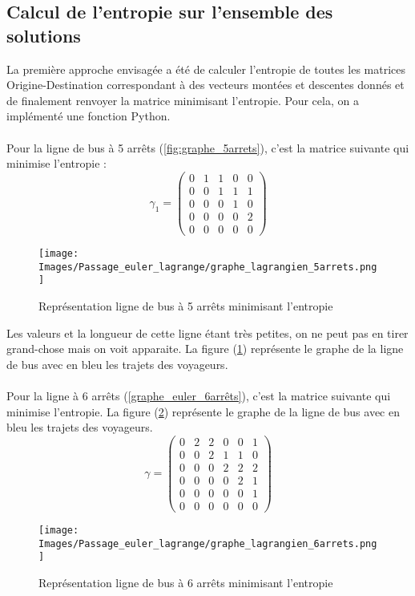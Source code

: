 \documentclass[12pt]{article}
\begin{document}
\subsection{Calcul de l'entropie sur l'ensemble des solutions}
La première approche envisagée a été de calculer l'entropie de toutes les matrices Origine-Destination correspondant à des vecteurs montées et descentes donnés et de finalement renvoyer la matrice minimisant l'entropie. Pour cela, on a implémenté une fonction Python.\\
\\
Pour la ligne de bus à 5 arrêts (\ref{fig:graphe_5arrets}), c'est la matrice suivante qui minimise l'entropie :
 \[\gamma_1 = 
\begin{pmatrix}
0 & 1 & 1 & 0 & 0\\
0 & 0 & 1 & 1 &  1\\
0 & 0 & 0 & 1 & 0 \\
0 & 0 & 0 & 0 & 2 \\
0 & 0 & 0 & 0 & 0 
\end{pmatrix}\]
\begin{figure}[H]
    \centering
    \texttt{[image: Images/Passage\_euler\_lagrange/graphe\_lagrangien\_5arrets.png]}
    \caption{Représentation ligne de bus à 5 arrêts minimisant l'entropie}
    \label{graphe_lagrange_5arrêts}
\end{figure}
Les valeurs et la longueur de cette ligne étant très petites, on ne peut pas en tirer grand-chose mais on voit apparaite. La figure (\ref{graphe_lagrange_5arrêts}) représente le graphe de la ligne de bus avec en bleu les trajets des voyageurs.\\
\\
Pour la ligne à 6 arrêts (\ref{graphe_euler_6arrêts}), c'est la matrice suivante qui minimise l'entropie.  La figure (\ref{graphe_lagrange_6arrêts}) représente le graphe de la ligne de bus avec en bleu les trajets des voyageurs.
 \[\gamma = 
\begin{pmatrix}
0 & 2 & 2 & 0 & 0 & 1\\
0 & 0 & 2 & 1 &  1 & 0\\
0 & 0 & 0 & 2 & 2 & 2 \\
0 & 0 & 0 & 0 & 2 & 1 \\
0 & 0 & 0 & 0 & 0 & 1 \\
0 & 0 & 0 & 0 & 0 & 0
\end{pmatrix}\]
\begin{figure}[H]
    \centering
    \texttt{[image: Images/Passage\_euler\_lagrange/graphe\_lagrangien\_6arrets.png]}
    \caption{Représentation ligne de bus à 6 arrêts minimisant l'entropie}
    \label{graphe_lagrange_6arrêts}
\end{figure}
\end{document}
